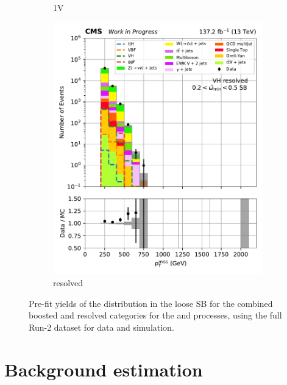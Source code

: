 \begin{figure}[htbp]
\begin{subfigure}[b]{0.24\textwidth}
        \caption{\VH 1V}
    \end{subfigure}
    \hfill
    \begin{subfigure}[b]{0.24\textwidth}
        \includegraphics[width=\textwidth]{figures/region_plots/2016to18/sideband_4/VH_resolved.pdf}
        \caption{\VH resolved}
    \end{subfigure}
    \caption[Pre-fit yields of the \ptmiss distribution in the loose \omegaTilde sideband for the combined boosted and resolved categories for the \ttH and \VH processes, using the full Run-2 dataset for data and simulation]{Pre-fit yields of the \ptmiss distribution in the loose \omegaTilde \gls{SB} for the combined boosted and resolved categories for the \ttH and \VH processes, using the full Run-2 dataset for data and simulation.}
    \label{fig:htoinv_sb_yields_comb2016to18_loose_minOmegaTilde}
\end{figure}




\section{Background estimation}
\label{sec:htoinv_background_est}

